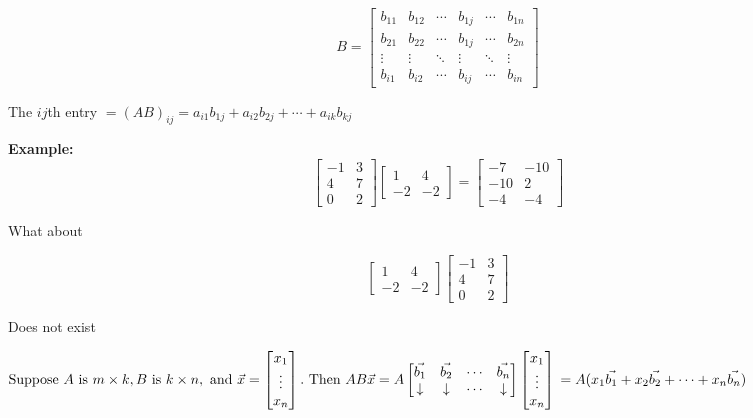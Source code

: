 \documentclass{article}
\begin{document}
\[ B = \begin{bmatrix} b_{11} & b_{12} & \cdots & b_{1j} & \cdots & b_{1n} \\ b_{21} & b_{22} & \cdots & b_{1j} & \cdots & b_{2n} \\ \vdots & \vdots & \ddots & \vdots & \ddots & \vdots \\ b_{i1} & b_{i2} & \cdots & b_{ij} & \cdots & b_{in} \end{bmatrix} \]

\medskip

The \(ij\)th entry \(= (AB)_{ij} = a_{i1}b_{1j} + a_{i2}b_{2j} + \cdots + a_{ik}b_{kj}\)

\medskip
\textbf{Example:}
\[
\begin{bmatrix}
-1 & 3 \\
4 & 7 \\
0 & 2
\end{bmatrix}
\begin{bmatrix}
1 & 4 \\
-2 & -2
\end{bmatrix}
=
\begin{bmatrix}
-7 & -10 \\
-10 & 2 \\
-4 & -4
\end{bmatrix}
\]

What about

\[
\begin{bmatrix}
1 & 4 \\
-2 & -2
\end{bmatrix}
\begin{bmatrix}
-1 & 3 \\
4 & 7 \\
0 & 2
\end{bmatrix}
\]


Does not exist

$\text{Suppose } A \text{ is } m \times k, B \text{ is } k \times n, \text{ and } \vec{x} = \begin{bmatrix} x_1 \\ \vdots \\ x_n \end{bmatrix}. \\
\text{ Then } AB\vec{x} = A \begin{bmatrix} \vec{b_1} & \vec{b_2} & \cdots & \vec{b_n} \\
\downarrow & \downarrow & \cdots & \downarrow
\end{bmatrix} 
\begin{bmatrix} x_1 \\ \vdots \\ x_n \end{bmatrix} \\
= A(x_1\vec{b_1} + x_2\vec{b_2} + \cdots + x_n\vec{b_n})$
\end{document}
